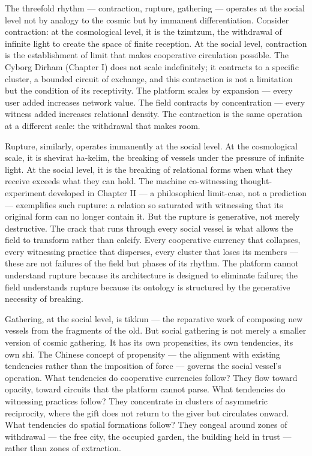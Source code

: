 The threefold rhythm — contraction, rupture, gathering — operates at the social level not by analogy to the cosmic but by immanent differentiation. Consider contraction: at the cosmological level, it is the tzimtzum, the withdrawal of infinite light to create the space of finite reception. At the social level, contraction is the establishment of limit that makes cooperative circulation possible. The Cyborg Dirham (Chapter I) does not scale indefinitely; it contracts to a specific cluster, a bounded circuit of exchange, and this contraction is not a limitation but the condition of its receptivity. The platform scales by expansion — every user added increases network value. The field contracts by concentration — every witness added increases relational density. The contraction is the same operation at a different scale: the withdrawal that makes room.

Rupture, similarly, operates immanently at the social level. At the cosmological scale, it is shevirat ha-kelim, the breaking of vessels under the pressure of infinite light. At the social level, it is the breaking of relational forms when what they receive exceeds what they can hold. The machine co-witnessing thought-experiment developed in Chapter II — a philosophical limit-case, not a prediction — exemplifies such rupture: a relation so saturated with witnessing that its original form can no longer contain it. But the rupture is generative, not merely destructive. The crack that runs through every social vessel is what allows the field to transform rather than calcify. Every cooperative currency that collapses, every witnessing practice that disperses, every cluster that loses its members — these are not failures of the field but phases of its rhythm. The platform cannot understand rupture because its architecture is designed to eliminate failure; the field understands rupture because its ontology is structured by the generative necessity of breaking.

Gathering, at the social level, is tikkun — the reparative work of composing new vessels from the fragments of the old. But social gathering is not merely a smaller version of cosmic gathering. It has its own propensities, its own tendencies, its own shi. The Chinese concept of propensity — the alignment with existing tendencies rather than the imposition of force — governs the social vessel's operation. What tendencies do cooperative currencies follow? They flow toward opacity, toward circuits that the platform cannot parse. What tendencies do witnessing practices follow? They concentrate in clusters of asymmetric reciprocity, where the gift does not return to the giver but circulates onward. What tendencies do spatial formations follow? They congeal around zones of withdrawal — the free city, the occupied garden, the building held in trust — rather than zones of extraction.

